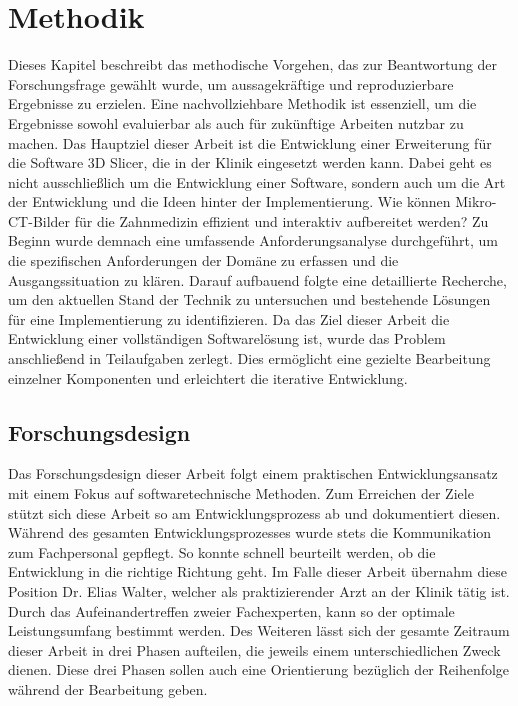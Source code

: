 \chapter{Methodik}
\label{chap:methodik} Dieses Kapitel beschreibt das methodische Vorgehen, das
zur Beantwortung der Forschungsfrage gewählt wurde, um aussagekräftige und reproduzierbare
Ergebnisse zu erzielen. Eine nachvollziehbare Methodik ist essenziell, um die Ergebnisse
sowohl evaluierbar als auch für zukünftige Arbeiten nutzbar zu machen. Das
Hauptziel dieser Arbeit ist die Entwicklung einer Erweiterung für die Software
3D Slicer, die in der Klinik eingesetzt werden kann. Dabei geht es nicht
ausschließlich um die Entwicklung einer Software, sondern auch um die Art der Entwicklung
und die Ideen hinter der Implementierung. Wie können Mikro-\ac{CT}-Bilder für die
Zahnmedizin effizient und interaktiv aufbereitet werden? Zu Beginn wurde demnach
eine umfassende Anforderungsanalyse durchgeführt, um die spezifischen Anforderungen
der Domäne zu erfassen und die Ausgangssituation zu klären. Darauf aufbauend
folgte eine detaillierte Recherche, um den aktuellen Stand der Technik zu untersuchen
und bestehende Lösungen für eine Implementierung zu identifizieren. Da das Ziel
dieser Arbeit die Entwicklung einer vollständigen Softwarelösung ist, wurde das Problem
anschließend in Teilaufgaben zerlegt. Dies ermöglicht eine gezielte Bearbeitung
einzelner Komponenten und erleichtert die iterative Entwicklung.

\section{Forschungsdesign}
Das Forschungsdesign dieser Arbeit folgt einem praktischen Entwicklungsansatz
mit einem Fokus auf softwaretechnische Methoden. Zum Erreichen der Ziele stützt sich
diese Arbeit so am Entwicklungsprozess ab und dokumentiert diesen. Während des
gesamten Entwicklungsprozesses wurde stets die Kommunikation zum Fachpersonal
gepflegt. So konnte schnell beurteilt werden, ob die Entwicklung in die richtige
Richtung geht. Im Falle dieser Arbeit übernahm diese Position Dr. Elias Walter, welcher
als praktizierender Arzt an der Klinik tätig ist. Durch das Aufeinandertreffen
zweier Fachexperten, kann so der optimale Leistungsumfang bestimmt werden. Des
Weiteren lässt sich der gesamte Zeitraum dieser Arbeit in drei Phasen aufteilen,
die jeweils einem unterschiedlichen Zweck dienen. Diese drei Phasen sollen auch
eine Orientierung bezüglich der Reihenfolge während der Bearbeitung geben.
\pagebreak


